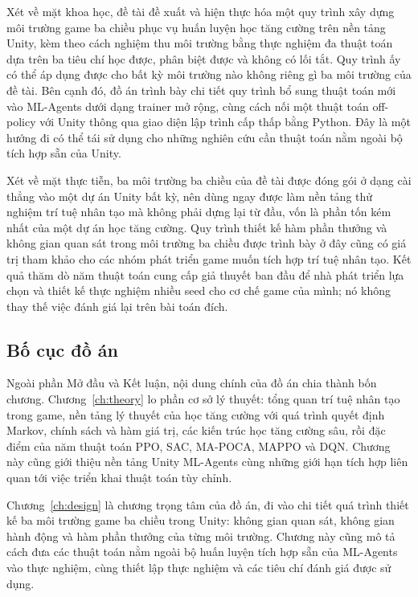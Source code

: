 \indent Xét về mặt khoa học, đề tài đề xuất và hiện thực hóa một quy trình xây dựng môi
trường game ba chiều phục vụ huấn luyện học tăng cường trên nền tảng Unity, kèm theo cách
nghiệm thu môi trường bằng thực nghiệm đa thuật toán dựa trên ba tiêu chí học được,
phân biệt được và không có lối tắt. Quy trình ấy có thể áp dụng được cho bất kỳ môi trường nào không riêng gì ba môi trường của đề tài. Bên cạnh đó, đồ án trình bày chi tiết
quy trình bổ sung thuật toán mới vào ML-Agents dưới dạng trainer mở rộng, cùng cách nối
một thuật toán off-policy với Unity thông qua giao diện lập trình cấp thấp bằng Python.
Đây là một hướng đi có thể tái sử dụng cho những nghiên cứu cần thuật toán nằm ngoài bộ
tích hợp sẵn của Unity.

\indent Xét về mặt thực tiễn, ba môi trường ba chiều của đề tài được đóng gói ở dạng cài
thẳng vào một dự án Unity bất kỳ, nên dùng ngay được làm nền tảng thử nghiệm trí tuệ nhân
tạo mà không phải dựng lại từ đầu, vốn là phần tốn kém nhất của một dự án học tăng cường.
Quy trình thiết kế hàm phần thưởng và không gian quan sát trong môi trường ba chiều được
trình bày ở đây cũng có giá trị tham khảo cho các nhóm phát triển game muốn tích hợp trí
tuệ nhân tạo. Kết quả thăm dò năm thuật toán cung cấp giả thuyết ban đầu để nhà phát triển
lựa chọn và thiết kế thực nghiệm nhiều seed cho cơ chế game của mình; nó không thay thế
việc đánh giá lại trên bài toán đích.

\subsection{Bố cục đồ án}
\indent Ngoài phần Mở đầu và Kết luận, nội dung chính của đồ án chia thành bốn chương.
Chương~\ref{ch:theory} lo phần cơ sở lý thuyết: tổng quan trí tuệ nhân tạo trong game,
nền tảng lý thuyết của học tăng cường với quá trình quyết định Markov, chính sách và hàm
giá trị, các kiến trúc học tăng cường sâu, rồi đặc điểm của năm thuật toán PPO, SAC,
MA-POCA, MAPPO và DQN. Chương này cũng giới thiệu nền tảng Unity ML-Agents cùng những
giới hạn tích hợp liên quan tới việc triển khai thuật toán tùy chỉnh.

\indent Chương~\ref{ch:design} là chương trọng tâm của đồ án, đi vào chi tiết quá trình
thiết kế ba môi trường game ba chiều trong Unity: không gian quan sát, không gian hành
động và hàm phần thưởng của từng môi trường. Chương này cũng mô tả cách đưa các thuật
toán nằm ngoài bộ huấn luyện tích hợp sẵn của ML-Agents vào thực nghiệm, cùng thiết lập
thực nghiệm và các tiêu chí đánh giá được sử dụng. 

